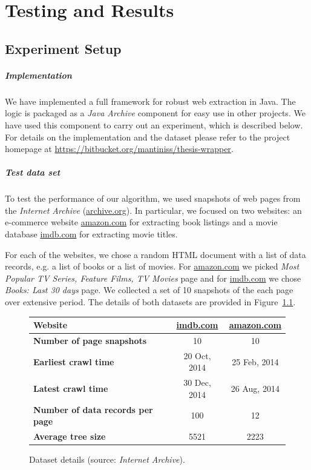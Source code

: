 \chapter{Testing and Results}
\label{ch:results}


\section{Experiment Setup}

\paragraph{Implementation} We have implemented a full framework for robust web extraction in Java. The logic is packaged as a \emph{Java Archive} component for easy use in other projects. We have used this component to carry out an experiment, which is described below. For details on the implementation and the dataset please refer to the project homepage at \url{https://bitbucket.org/mantiniss/thesis-wrapper}.

\paragraph{Test data set} To test the performance of our algorithm, we used snapshots of web pages from the \emph{Internet Archive} (\url{archive.org}). In particular, we focused on two websites: an e-commerce website \url{amazon.com} for extracting book listings and a movie database \url{imdb.com} for extracting movie titles.

For each of the websites, we chose a random HTML document with a list of data records, e.g. a list of books or a list of movies. For \url{amazon.com} we picked \emph{Most Popular TV Series, Feature Films, TV Movies} page and for \url{imdb.com} we chose \emph{Books: Last 30 days} page. We collected a set of 10 snapshots of the each page over extensive period. The details of both datasets are provided in Figure~\ref{tbl:dataset}.

\begin{figure}[h]
	\centering
    \begin{tabularx}{\textwidth}{ | X | c | c | }
		\hline
		\textbf{Website} & \url{imdb.com} & \url{amazon.com} \\
		\hline
		\textbf{Number of page snapshots} & 10 & 10 \\
		\hline
		\textbf{Earliest crawl time} & 20 Oct, 2014 & 25 Feb, 2014 \\
		\hline
		\textbf{Latest crawl time} & 30 Dec, 2014 & 26 Aug, 2014 \\
		\hline
		\textbf{Number of data records per page} & 100 & 12 \\
		\hline
		\textbf{Average tree size} & 5521 & 2223 \\
		\hline
    \end{tabularx}
	\caption{Dataset details (source: \emph{Internet Archive}).}
	\label{tbl:dataset}
\end{figure}

